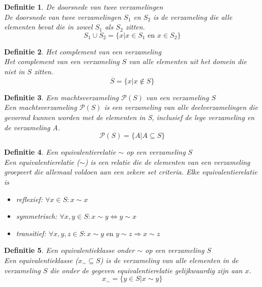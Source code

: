\documentclass[a4paper]{article}
\newtheorem{tdefinitie}{Definitie}[section]
\newenvironment{definitie}[1]%
  {\begin{mdframed}[backgroundcolor=silver,
    topline=false,
    rightline=false,
    leftline=false,
    bottomline=false]\begin{tdefinitie}#1\\\normalfont}%
  {\end{tdefinitie}\end{mdframed}}
\newcommand{\powerset}{\ensuremath{\mathcal{P}}}
\newcommand{\en}{\ensuremath{\text{ en }}}
\begin{document}
\begin{definitie}{De doorsnede van twee verzamelingen}
  De doorsnede van twee verzamelingen $S_1$ en $S_2$ is de verzameling die alle elementen bevat die in zowel $S_1$ als $S_2$ zitten.
  \begin{equation*}
  S_1 \cup S_2 = \{x|x \in S_1 \en x \in S_2\}
  \end{equation*}
\end{definitie}

\begin{definitie}{Het complement van een verzameling}
  Het complement van een verzameling $S$ van alle elementen uit het domein die niet in $S$ zitten.
  \begin{equation*}
  \overline{S} = \{x|x \notin S\}
  \end{equation*}
\end{definitie}

\begin{definitie}{Een machtsverzameling $\powerset(S)$ van een verzameling $S$}
  Een machtsverzameling $\powerset(S)$ is een verzameling van alle deelverzamelingen die gevormd kunnen worden met de elementen in S, inclusief de lege verzameling en de verzameling A.
  \begin{equation*}
  \powerset(S) = \{A|A \subseteq S\}
  \end{equation*}
\end{definitie}

\begin{definitie}{Een equivalentierelatie $\sim$ op een verzameling $S$}
  Een equivalentierelatie ($\sim$) is een relatie die de elementen van een verzameling groepeert die allemaal voldoen aan een zekere set criteria. Elke equivalentierelatie is
  \begin{itemize}
  \item reflexief: $\forall x \in S: x \sim x$
  \item symmetrisch: $\forall x, y \in S: x \sim y \Leftrightarrow y \sim x$
  \item transitief: $\forall x, y, z \in S: x \sim y \en y \sim z \Rightarrow x \sim z$
  \end{itemize}
\end{definitie}

\begin{definitie}{Een equivalentieklasse onder $\sim$ op een verzameling $S$}
  Een equivalentieklasse ($x_\sim \subseteq S$) is de verzameling van alle elementen in de verzameling $S$ die onder de gegeven equivalentierelatie gelijkwaardig zijn aan $x$.
  \begin{equation*}
  x_\sim = \{y \in S|x \sim y\}
  \end{equation*}
\end{definitie}
\end{document}
